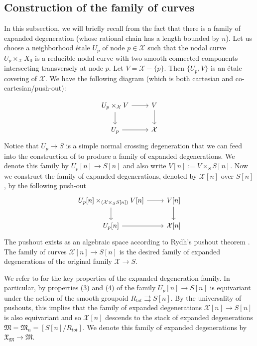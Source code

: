 \documentclass[11pt]{amsart}
\theoremstyle{plain}
\numberwithin{equation}{section}
\theoremstyle{definition}
\theoremstyle{plain}
\begin{document}
\smallskip

\subsection{\textbf{Construction of the family of curves}}\label{Fam} In this subsection, we will briefly recall from \cite{Li, Z} the fact that there is a family of expanded degeneration (whose rational chain has a length bounded by $n$). Let us choose a neighborhood \'{e}tale $U_p$ of node $p\in \mathcal X$ such that the nodal curve \linebreak $U_p\times_{\mathcal X} X_0$ is a reducible nodal curve with two smooth connected components intersecting transversely at node $p$. Let $V = \mathcal{X} - \{p\}$. Then $\{U_{p},V\}$ is an 
\'{e}tale covering of $\mathcal{X}$. We have the following diagram (which is both cartesian and co-cartesian/push-out):

\begin{equation}
\begin{tikzcd}
U_p\times_{\mathcal X} V\arrow{d} \arrow{r} & V \arrow{d}\\
U_p\arrow{r} & \mathcal X
\end{tikzcd}
\end{equation}
Notice that $U_p\longrightarrow S$ is a simple normal crossing degeneration that we can feed into the construction of \cite{Li, Z} to produce a family of expanded degenerations. We denote this family by $U_p[n]\longrightarrow S[n]$ and also write $V[n]:=V\times_{S} S[n]$. Now we construct the family of expanded degenerations, denoted by $\mathcal{X}[n]$ over $S[n]$, by the following push-out
\begin{equation}
\begin{tikzcd}
U_p[n]\times_{(\mathcal X\times_S S[n])} V[n]\arrow{d} \arrow{r} &  V[n] \arrow{d}\\
U_p[n]\arrow{r} & \mathcal X[n]
\end{tikzcd}
\end{equation}
The pushout exists as an algebraic space according to Rydh's pushout theorem \cite[Theorem C]{R}.
The family of curves $\mathcal X[n]\longrightarrow S[n]$ is the desired family of expanded degenerations of the original family $\mathcal X\longrightarrow S$. 

We refer to \cite[Proposition 2.13]{Z} for the key properties of the expanded degeneration family. In particular, by properties (3) and (4) of \cite[Proposition 2.13]{Z} the family $U_p[n] \to S[n]$ is equivariant under the action of the smooth groupoid $R_{tot}\rightrightarrows S[n]$. By the universality of pushouts, this implies that the family of expanded degenerations $\mathcal{X}[n] \to S[n]$ is also equivariant and so $\mathcal{X}[n]$ descends to the stack of expanded degenerations $\mathfrak{M} = \mathfrak{M}_{n} = \left[S[n]/R_{tot}\right]$. We denote this family of expanded degenerations by $\mathfrak{X}_\mathfrak{M} \to \mathfrak{M}$.
\end{document}
